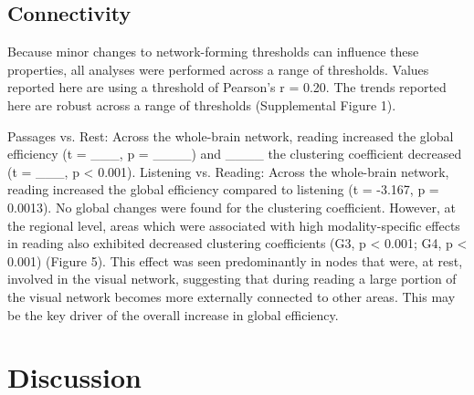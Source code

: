 \subsection{Connectivity}
Because minor changes to network-forming thresholds can influence these properties, all analyses were performed across a range of thresholds. Values reported here are using a threshold of Pearson’s r = 0.20. The trends reported here are robust across a range of thresholds (Supplemental Figure 1). 

Passages vs. Rest: Across the whole-brain network, reading increased the global efficiency (t = ___, p = ____) and ____ the clustering coefficient decreased (t = ___, p < 0.001).
Listening vs. Reading: Across the whole-brain network, reading increased the global efficiency compared to listening (t = -3.167, p = 0.0013). No global changes were found for the clustering coefficient. However, at the regional level, areas which were associated with high modality-specific effects in reading also exhibited decreased clustering coefficients (G3, p < 0.001; G4, p < 0.001) (Figure 5). This effect was seen predominantly in nodes that were, at rest, involved in the visual network, suggesting that during reading a large portion of the visual network becomes more externally connected to other areas. This may be the key driver of the overall increase in global efficiency.


\section{Discussion}